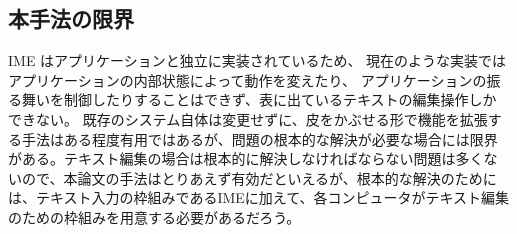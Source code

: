 \subsection{本手法の限界}

IME はアプリケーションと独立に実装されているため、
現在のような実装ではアプリケーションの内部状態によって動作を変えたり、
アプリケーションの振る舞いを制御したりすることはできず、表に出ているテキストの編集操作しか
できない。 既存のシステム自体は変更せずに、皮をかぶせる形で機能を拡張す
る手法はある程度有用ではあるが、問題の根本的な解決が必要な場合には限界
がある。テキスト編集の場合は根本的に解決しなければならない問題は多くな
いので、本論文の手法はとりあえず有効だといえるが、根本的な解決のために
は、テキスト入力の枠組みであるIMEに加えて、各コンピュータがテキスト編集
のための枠組みを用意する必要があるだろう。


